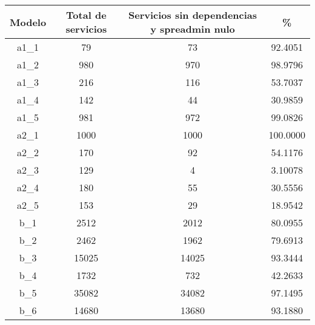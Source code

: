 \begin{table}[]
	\centering
	\begin{tabular}{@{}cccc@{}}
		\toprule
		{\bf Modelo} & {\bf Total de servicios} & {\bf Servicios sin dependencias y spreadmin nulo} & {\bf \%} \\ \midrule
		a1\_1        & 79                       & 73                                                & 92.4051  \\
		a1\_2        & 980                      & 970                                               & 98.9796  \\
		a1\_3        & 216                      & 116                                               & 53.7037  \\
		a1\_4        & 142                      & 44                                                & 30.9859  \\
		a1\_5        & 981                      & 972                                               & 99.0826  \\
		a2\_1        & 1000                     & 1000                                              & 100.0000 \\
		a2\_2        & 170                      & 92                                                & 54.1176  \\
		a2\_3        & 129                      & 4                                                 & 3.10078  \\
		a2\_4        & 180                      & 55                                                & 30.5556  \\
		a2\_5        & 153                      & 29                                                & 18.9542  \\
		b\_1         & 2512                     & 2012                                              & 80.0955  \\
		b\_2         & 2462                     & 1962                                              & 79.6913  \\
		b\_3         & 15025                    & 14025                                             & 93.3444  \\
		b\_4         & 1732                     & 732                                               & 42.2633  \\
		b\_5         & 35082                    & 34082                                             & 97.1495  \\
		b\_6         & 14680                    & 13680                                             & 93.1880  \\

\end{tabular}
\end{table}

